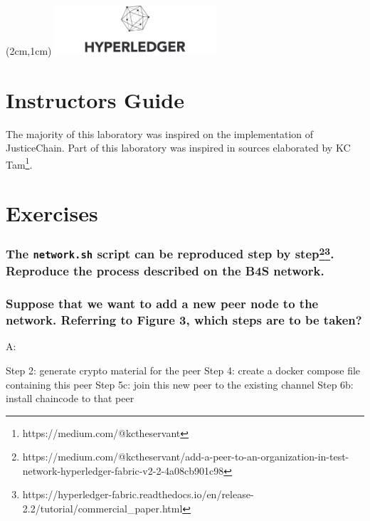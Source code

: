 \documentclass[12pt,a4paper]{article}
\begin{document}
\textblockorigin{-34pt}{-12pt}
\begin{textblock*}{10cm}(2cm,1cm)
\includegraphics[width=6cm]{hyperledger.png}
\end{textblock*}

\section*{Instructors Guide}
The majority of this laboratory was inspired on the implementation of JusticeChain\cite{belchior2019_audits}. Part of this laboratory was inspired in sources elaborated by KC Tam\footnote{https://medium.com/@kctheservant}.

\section{Exercises}



\subsubsection*{The \texttt{network.sh} script can be reproduced step by step\footnote{https://medium.com/@kctheservant/add-a-peer-to-an-organization-in-test-network-hyperledger-fabric-v2-2-4a08cb901c98}\footnote{https://hyperledger-fabric.readthedocs.io/en/release-2.2/tutorial/commercial_paper.html}. Reproduce the process described on the B4S network.}

\subsubsection*{Suppose that we want to add a new peer node to the network. Referring to Figure 3, which steps are to be taken?}

A: 

Step 2: generate crypto material for the peer
Step 4: create a docker compose file containing this peer
Step 5c: join this new peer to the existing channel
Step 6b: install chaincode to that peer
\end{document}
